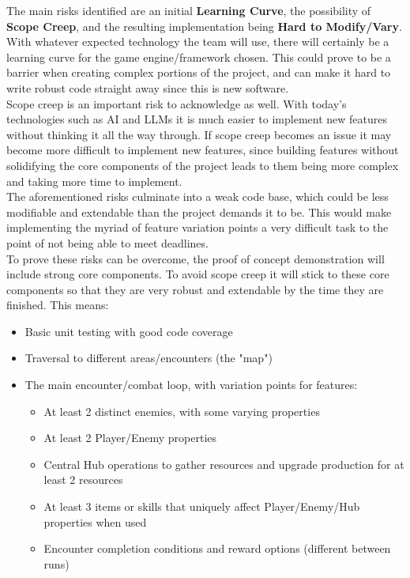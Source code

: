 The main risks identified are an initial \textbf{Learning Curve}, the possibility of \textbf{Scope Creep}, and the resulting implementation being \textbf{Hard to Modify/Vary}.
\\

\noindent With whatever expected technology the team will use, there will certainly be a learning curve for the game engine/framework chosen. This could prove to be a barrier when creating complex portions of the project, and can make it hard to write robust code straight away since this is new software. 
\\ 

\noindent Scope creep is an important risk to acknowledge as well. With today's technologies such as AI and LLMs it is much easier to implement new features without thinking it all the way through. If scope creep becomes an issue it may become more difficult to implement new features, since building features without solidifying the core components of the project leads to them being more complex and taking more time to implement. 
\\

\noindent The aforementioned risks culminate into a weak code base, which could be less modifiable and extendable than the project demands it to be. This would make implementing the myriad of feature variation points a very difficult task to the point of not being able to meet deadlines.
\\

\noindent To prove these risks can be overcome, the proof of concept demonstration will include strong core components. To avoid scope creep it will stick to these core components so that they are very robust and extendable by the time they are finished. This means:
\begin{itemize}
        \item Basic unit testing with good code coverage
        \item Traversal to different areas/encounters (the "map")
        \item The main encounter/combat loop, with variation points for features:
        \begin{itemize}
                 \item At least 2 distinct enemies, with some varying properties
                 \item At least 2 Player/Enemy properties
                 \item Central Hub operations to gather resources and upgrade production for at least 2 resources
                 \item At least 3 items or skills that uniquely affect Player/Enemy/Hub properties when used
                 \item Encounter completion conditions and reward options (different between runs)
        \end{itemize}
\end{itemize}


